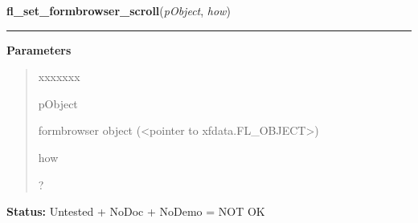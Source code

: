 \hspace{.8\funcindent}\begin{boxedminipage}{\funcwidth}

    \raggedright \textbf{fl\_set\_formbrowser\_scroll}(\textit{pObject}, \textit{how})

    \vspace{-1.5ex}

    \rule{\textwidth}{0.5\fboxrule}
\setlength{\parskip}{2ex}
\setlength{\parskip}{1ex}
      \textbf{Parameters}
      \vspace{-1ex}

      \begin{quote}
        \begin{Ventry}{xxxxxxx}

          \item[pObject]

          formbrowser object ({\textless}pointer to 
          xfdata.FL\_OBJECT{\textgreater})

          \item[how]

          ?

        \end{Ventry}

      \end{quote}

\textbf{Status:} Untested + NoDoc + NoDemo = NOT OK



    \end{boxedminipage}

    \label{xformslib:library:fl_set_formbrowser_hscrollbar}

    \vspace{0.5ex}


